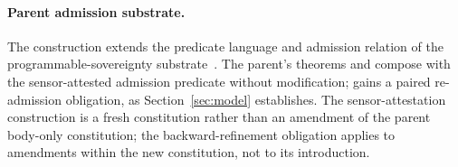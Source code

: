 \paragraph{Parent admission substrate.}
The construction extends the predicate language and admission relation of the programmable-sovereignty substrate~\cite{chioProgrammableSovereignty2027}. The parent's theorems  and  compose with the sensor-attested admission predicate without modification;  gains a paired re-admission obligation, as Section~\ref{sec:model} establishes. The sensor-attestation construction is a fresh constitution rather than an amendment of the parent body-only constitution; the backward-refinement obligation applies to amendments within the new constitution, not to its introduction.
